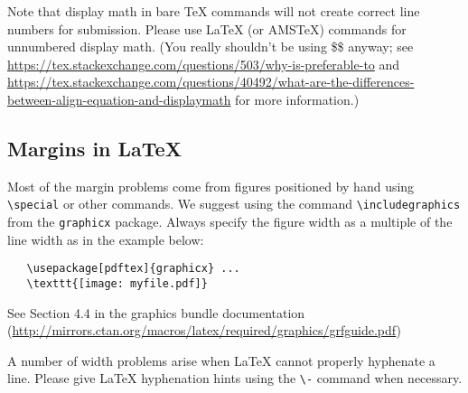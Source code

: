 \documentclass{article}
\begin{document}
Note that display math in bare TeX commands will not create correct line numbers for submission. Please use LaTeX (or AMSTeX) commands for unnumbered display math. (You really shouldn't be using \$\$ anyway; see \url{https://tex.stackexchange.com/questions/503/why-is-preferable-to} and \url{https://tex.stackexchange.com/questions/40492/what-are-the-differences-between-align-equation-and-displaymath} for more information.)

\subsection{Margins in \LaTeX{}}

Most of the margin problems come from figures positioned by hand using
\verb+\special+ or other commands. We suggest using the command
\verb+\includegraphics+ from the \verb+graphicx+ package. Always specify the
figure width as a multiple of the line width as in the example below:
\begin{verbatim}
   \usepackage[pdftex]{graphicx} ...
   \texttt{[image: myfile.pdf]}
\end{verbatim}
See Section 4.4 in the graphics bundle documentation
(\url{http://mirrors.ctan.org/macros/latex/required/graphics/grfguide.pdf})

A number of width problems arise when \LaTeX{} cannot properly hyphenate a
line. Please give LaTeX hyphenation hints using the \verb+\-+ command when
necessary.





\end{document}
